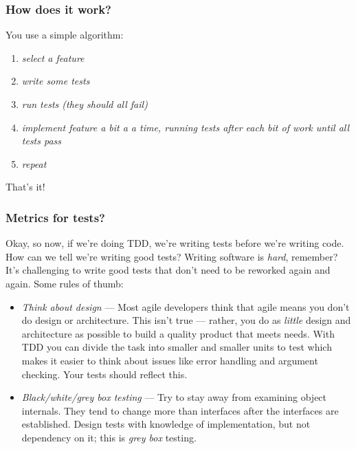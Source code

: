\documentclass[t, 10pt]{beamer}
\begin{document}
\begin{frame}
\frametitle{How does it work?}
You use a simple algorithm:
\begin{enumerate}
\item \textit{select a feature}
\newline
\item \textit{write some tests}
\newline
\item \textit{run tests (they should all fail)}
\newline
\item \textit{implement feature a bit a a time, running tests after each bit of work until all tests pass}
\newline
\item \textit{repeat}
\end{enumerate}
That's it!
\end{frame}

\begin{frame}
\frametitle{Metrics for tests?}
Okay, so now, if we're doing TDD, we're writing tests before we're writing code.  How can we tell we're writing good tests?
\newline
\newline
Writing software is \textit{hard}, remember? It's challenging to write good tests that don't need to be reworked again and again.  Some rules of thumb:
\begin{itemize}
\item \textit{Think about design} --- Most agile developers think that agile means you don't do design or architecture.  This isn't true --- rather, you do as \textit{little} design and architecture as possible to build a quality product that meets needs.  With TDD you can divide the task into smaller and smaller units to test which makes it easier to think about issues like error handling and argument checking.  Your tests should reflect this.
\item \textit{Black/white/grey box testing} --- Try to stay away from examining object internals.  They tend to change more than interfaces after the interfaces are established.  Design tests with knowledge of implementation, but not dependency on it; this is \textit{grey box} testing.
\end{itemize}
\end{frame}
\end{document}

